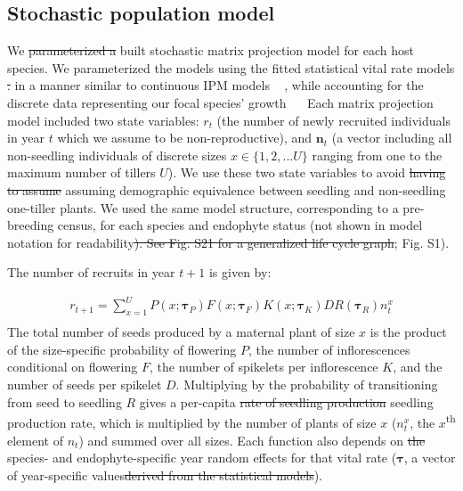 \documentclass[lineno, sn-basic]{sn-jnl}%
\providecommand{\DIFadd}[1]{{\protect\color{blue}#1}} %
\providecommand{\DIFdel}[1]{{\protect\color{red}\protect\scriptsize\sout{#1}}}
\providecommand{\DIFadd}[1]{{\protect\color{blue}\uwave{#1}}} %
\providecommand{\DIFdel}[1]{{\protect\color{red}\sout{#1}}}                      %
\providecommand{\DIFaddbegin}{} %
\providecommand{\DIFaddend}{} %
\providecommand{\DIFdelbegin}{} %
\providecommand{\DIFdelend}{} %
\newcommand{\DIFscaledelfig}{0.5}
\newlength{\DIFdelgraphicswidth} %
\newlength{\DIFdelgraphicsheight} %
\newcommand{\DIFaddincludegraphics}[2][]{{\color{blue}\fbox{\DIFOincludegraphics[#1]{#2}}}} %
\newcommand{\DIFdelincludegraphics}[2][]{%
\sbox{\DIFdelgraphicsbox}{\DIFOincludegraphics[#1]{#2}}%
\settoboxwidth{\DIFdelgraphicswidth}{\DIFdelgraphicsbox} %
\settoboxtotalheight{\DIFdelgraphicsheight}{\DIFdelgraphicsbox} %
\scalebox{\DIFscaledelfig}{%
\parbox[b]{\DIFdelgraphicswidth}{\usebox{\DIFdelgraphicsbox}\\[-\baselineskip] \rule{\DIFdelgraphicswidth}{0em}}\llap{\resizebox{\DIFdelgraphicswidth}{\DIFdelgraphicsheight}{%
\setlength{\unitlength}{\DIFdelgraphicswidth}%
\begin{picture}(1,1)%
\thicklines\linethickness{2pt} %
{\color[rgb]{1,0,0}\put(0,0){\framebox(1,1){}}}%
{\color[rgb]{1,0,0}\put(0,0){\line( 1,1){1}}}%
{\color[rgb]{1,0,0}\put(0,1){\line(1,-1){1}}}%
\end{picture}%
}\hspace*{3pt}}} %
} %
\DeclareRobustCommand{\DIFaddbegin}{\DIFOaddbegin \let\includegraphics\DIFaddincludegraphics} %
\DeclareRobustCommand{\DIFaddend}{\DIFOaddend \let\includegraphics\DIFOincludegraphics} %
\DeclareRobustCommand{\DIFdelbegin}{\DIFOdelbegin \let\includegraphics\DIFdelincludegraphics} %
\DeclareRobustCommand{\DIFdelend}{\DIFOaddend \let\includegraphics\DIFOincludegraphics} %
\begin{document}
\subsection*{Stochastic population model}
We \DIFdelbegin \DIFdel{parameterized a }\DIFdelend \DIFaddbegin \DIFadd{built }\DIFaddend stochastic matrix projection model for each host species\DIFaddbegin \DIFadd{. 
We parameterized the models }\DIFaddend using the fitted statistical vital rate models \DIFdelbegin \DIFdel{. 
	}\DIFdelend \DIFaddbegin \DIFadd{in a manner similar to continuous IPM models \mbox{%
\citep{ellner2016data}}\hspace{0pt}%
, while accounting for the discrete data representing our focal species' growth \mbox{%
\citep{ellner2022critical}
}\hspace{0pt}%
}\DIFaddend Each matrix projection model included two state variables: $r_{t}$ (the number of newly recruited individuals in year $t$ which we assume to be non-reproductive), and $\textbf{n}_{t}$ (a vector including all non-seedling individuals of \DIFaddbegin \DIFadd{discrete }\DIFaddend sizes $x\in\{1,2,...U\}$ ranging from one to the maximum number of tillers $U$). 
We use these two state variables to avoid \DIFdelbegin \DIFdel{having to assume }\DIFdelend \DIFaddbegin \DIFadd{assuming }\DIFaddend demographic equivalence between seedling and non-seedling one-tiller plants. 
We used the same model structure, corresponding to a pre-breeding census, for each species and endophyte status (not shown in model notation for readability\DIFdelbegin \DIFdel{). 
	See Fig. S21 for a generalized life cycle graph}\DIFdelend \DIFaddbegin \DIFadd{; Fig. S1)}\DIFaddend . 

The number of recruits in year $t+1$ is given by:

\begin{equation} 
	\label{eq:MPM_F}
	\begin{aligned}
		r_{t+1} = \sum_{x=1}^{U} P(x; \pmb{\tau}_{P})F(x; \pmb{\tau}_{F})K(x; \pmb{\tau}_{K})DR(\pmb{\tau}_{R}) n^x_{t}\\
	\end{aligned}
\end{equation}
The total number of seeds produced by a maternal plant of size $x$ is the product of the size-specific probability of flowering $P$, the number of inflorescences conditional on flowering $F$, the number of spikelets per inflorescence $K$, and the number of seeds per spikelet $D$. 
Multiplying by the probability of transitioning from seed to seedling $R$ gives a per-capita \DIFdelbegin \DIFdel{rate of seedling production }\DIFdelend \DIFaddbegin \DIFadd{seedling production rate}\DIFaddend , which is multiplied by the number of plants of size $x$ ($n^x_{t}$, the $x$\textsuperscript{th} element of \textbf{$n_{t}$}) and summed over all sizes. 
Each function also depends on \DIFdelbegin \DIFdel{the }\DIFdelend species- and endophyte-specific year random effects for that vital rate ($\pmb{\tau}$, a vector of year-specific values\DIFdelbegin \DIFdel{derived from the statistical models}\DIFdelend ). 
\end{document}
